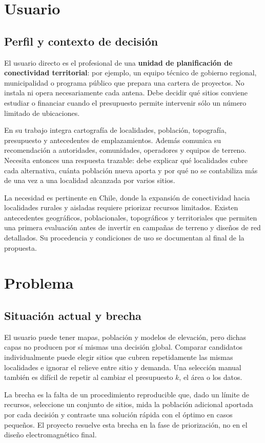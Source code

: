 \documentclass[12pt,letterpaper]{article}
\begin{document}
\section{Usuario}
\subsection{Perfil y contexto de decisión}
El usuario directo es el profesional de una \textbf{unidad de planificación de conectividad territorial}: por ejemplo, un equipo técnico de gobierno regional, municipalidad o programa público que prepara una cartera de proyectos. No instala ni opera necesariamente cada antena. Debe decidir qué sitios conviene estudiar o financiar cuando el presupuesto permite intervenir sólo un número limitado de ubicaciones.

En su trabajo integra cartografía de localidades, población, topografía, presupuesto y antecedentes de emplazamientos. Además comunica su recomendación a autoridades, comunidades, operadores y equipos de terreno. Necesita entonces una respuesta trazable: debe explicar qué localidades cubre cada alternativa, cuánta población nueva aporta y por qué no se contabiliza más de una vez a una localidad alcanzada por varios sitios.

La necesidad es pertinente en Chile, donde la expansión de conectividad hacia localidades rurales y aisladas requiere priorizar recursos limitados. Existen antecedentes geográficos, poblacionales, topográficos y territoriales que permiten una primera evaluación antes de invertir en campañas de terreno y diseños de red detallados. Su procedencia y condiciones de uso se documentan al final de la propuesta.

\section{Problema}
\subsection{Situación actual y brecha}
El usuario puede tener mapas, población y modelos de elevación, pero dichas capas no producen por sí mismas una decisión global. Comparar candidatos individualmente puede elegir sitios que cubren repetidamente las mismas localidades e ignorar el relieve entre sitio y demanda. Una selección manual también es difícil de repetir al cambiar el presupuesto $k$, el área o los datos.

La brecha es la falta de un procedimiento reproducible que, dado un límite de recursos, seleccione un conjunto de sitios, mida la población adicional aportada por cada decisión y contraste una solución rápida con el óptimo en casos pequeños. El proyecto resuelve esta brecha en la fase de priorización, no en el diseño electromagnético final.
\end{document}
